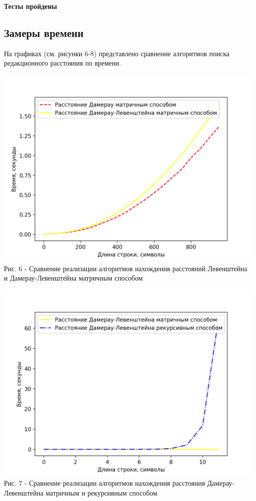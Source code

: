 \documentclass[a4paper,14pt]{article} %
\begin{document}
	\textbf{Тесты пройдены}

	\subsection{Замеры времени}
	
	\hfill
	
	На графиках (см. рисунки 6-8) представлено сравнение алгоритмов поиска редакционного расстояния по времени. 
	
	\begin{center}
        		\includegraphics[scale = 1]{graph1} \\ Рис. 6 - Сравнение реализации алгоритмов нахождения расстояний Левенштейна и Дамерау-Левенштейна матричным способом
	\end{center}
	
	\begin{center}
        		\includegraphics[scale = 1]{graph2} \\ Рис. 7 - Сравнение реализации алгоритмов нахождения расстояния Дамерау-Левенштейна матричным и рекурсивным способом
	\end{center}
	
\end{document}
